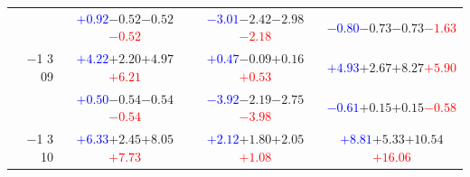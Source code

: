 \documentclass[compress]{beamer}
\begin{document}
\begin{frame}
\begin{tabular}{r | c | c | c}
          & \textcolor{blue}{$+0.92$}\hspace{0.1 cm}$-0.52$\hspace{0.1 cm}$-0.52$\hspace{0.1 cm}\textcolor{red}{$-0.52$} & \textcolor{blue}{$-3.01$}\hspace{0.1 cm}$-2.42$\hspace{0.1 cm}$-2.98$\hspace{0.1 cm}\textcolor{red}{$-2.18$} & \textcolor{blue}{$-0.80$}\hspace{0.1 cm}$-0.73$\hspace{0.1 cm}$-0.73$\hspace{0.1 cm}\textcolor{red}{$-1.63$} \\
$-$1 3 09 & \textcolor{blue}{$+4.22$}\hspace{0.1 cm}$+2.20$\hspace{0.1 cm}$+4.97$\hspace{0.1 cm}\textcolor{red}{$+6.21$} & \textcolor{blue}{$+0.47$}\hspace{0.1 cm}$-0.09$\hspace{0.1 cm}$+0.16$\hspace{0.1 cm}\textcolor{red}{$+0.53$} & \textcolor{blue}{$+4.93$}\hspace{0.1 cm}$+2.67$\hspace{0.1 cm}$+8.27$\hspace{0.1 cm}\textcolor{red}{$+5.90$} \\
          & \textcolor{blue}{$+0.50$}\hspace{0.1 cm}$-0.54$\hspace{0.1 cm}$-0.54$\hspace{0.1 cm}\textcolor{red}{$-0.54$} & \textcolor{blue}{$-3.92$}\hspace{0.1 cm}$-2.19$\hspace{0.1 cm}$-2.75$\hspace{0.1 cm}\textcolor{red}{$-3.98$} & \textcolor{blue}{$-0.61$}\hspace{0.1 cm}$+0.15$\hspace{0.1 cm}$+0.15$\hspace{0.1 cm}\textcolor{red}{$-0.58$} \\
$-$1 3 10 & \textcolor{blue}{$+6.33$}\hspace{0.1 cm}$+2.45$\hspace{0.1 cm}$+8.05$\hspace{0.1 cm}\textcolor{red}{$+7.73$} & \textcolor{blue}{$+2.12$}\hspace{0.1 cm}$+1.80$\hspace{0.1 cm}$+2.05$\hspace{0.1 cm}\textcolor{red}{$+1.08$} & \textcolor{blue}{$+8.81$}\hspace{0.1 cm}$+5.33$\hspace{0.1 cm}$+10.54$\hspace{0.1 cm}\textcolor{red}{$+16.06$} \\

\end{tabular}
\end{frame}
\end{document}
